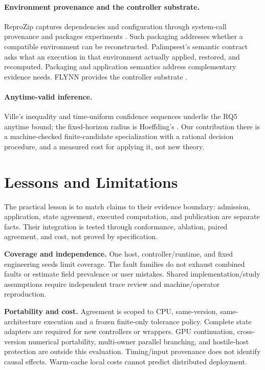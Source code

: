 \documentclass[10pt]{article}
\begin{document}
\paragraph{Environment provenance and the controller substrate.}
ReproZip captures dependencies and configuration through system-call provenance
and packages experiments \citep{chirigati2013reprozip}. Such packaging addresses
whether a compatible environment can be reconstructed. Palimpsest's semantic
contract asks what an execution in that environment actually applied, restored,
and recomputed. Packaging and application semantics address complementary evidence needs.
FLYNN provides the controller substrate \citep{wang2026flynn}.

\paragraph{Anytime-valid inference.}
Ville's inequality and time-uniform confidence sequences
\citep{ville1939etude,howard2021timeuniform} underlie the RQ5 anytime bound; the
fixed-horizon radius is Hoeffding's \citep{hoeffding1963probability}. Our
contribution there is a machine-checked finite-candidate specialization with a
rational decision procedure, and a measured cost for applying it, not new theory.

\section{Lessons and Limitations}
\label{sec:limits}
The practical lesson is to match claims to their evidence boundary: admission,
application, state agreement, executed computation, and publication are separate
facts. Their integration is tested through conformance, ablation, paired
agreement, and cost, not proved by specification.

\textbf{Coverage and independence.}
One host, controller/runtime, and fixed engineering seeds limit coverage.
The fault families do not exhaust combined faults or estimate field prevalence
or user mistakes. Shared implementation/study assumptions require independent
trace review and machine/operator reproduction.

\textbf{Portability and cost.}
Agreement is scoped to CPU, same-version, same-architecture execution and a
frozen finite-only tolerance policy. Complete state adapters are required for
new controllers or wrappers. GPU continuation, cross-version numerical
portability, multi-owner parallel branching, and hostile-host protection are
outside this evaluation. Timing/input provenance does not identify causal
effects. Warm-cache local costs cannot predict distributed deployment.
\end{document}
